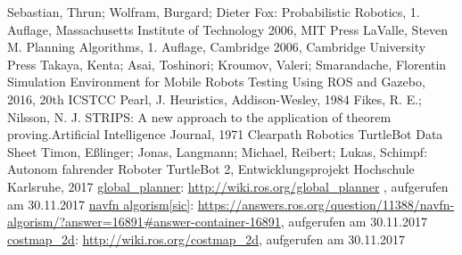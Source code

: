 \begin{thebibliography}{999}%
 Sebastian, Thrun; Wolfram, Burgard; Dieter Fox: \glqq Probabilistic Robotics\grqq , 1. Auflage, Massachusetts Institute of Technology 2006, MIT Press
 LaValle, Steven M. \glqq Planning Algorithms\grqq , 1. Auflage, Cambridge 2006, Cambridge University Press%
 Takaya, Kenta; Asai, Toshinori; Kroumov, Valeri; Smarandache, Florentin \glqq Simulation Environment for Mobile Robots Testing Using ROS and Gazebo\grqq , 2016, 20th ICSTCC
 Pearl, J. \glqq Heuristics\grqq , Addison-Wesley, 1984
 Fikes, R. E.; Nilsson, N. J.  \glqq STRIPS: A new approach to the application of theorem proving.\grqq Artificial Intelligence Journal, 1971
 Clearpath Robotics \glqq TurtleBot Data Sheet 
 Timon, Eßlinger; Jonas, Langmann; Michael, Reibert; Lukas, Schimpf: \glqq Autonom fahrender Roboter TurtleBot 2\grqq , Entwicklungsprojekt Hochschule Karlsruhe, 2017
 \href{http://wiki.ros.org/global_planner}{global\_planner}:  \url{http://wiki.ros.org/global_planner} , aufgerufen am 30.11.2017
 \href{https://answers.ros.org/question/11388/navfn-algorism/?answer=16891#answer-container-16891}{navfn algorism[sic]}: \url{https://answers.ros.org/question/11388/navfn-algorism/?answer=16891#answer-container-16891}, aufgerufen am 30.11.2017
 \href{http://wiki.ros.org/costmap_2d}{costmap\_2d}: \url{http://wiki.ros.org/costmap_2d}, aufgerufen am 30.11.2017

\end{thebibliography}
